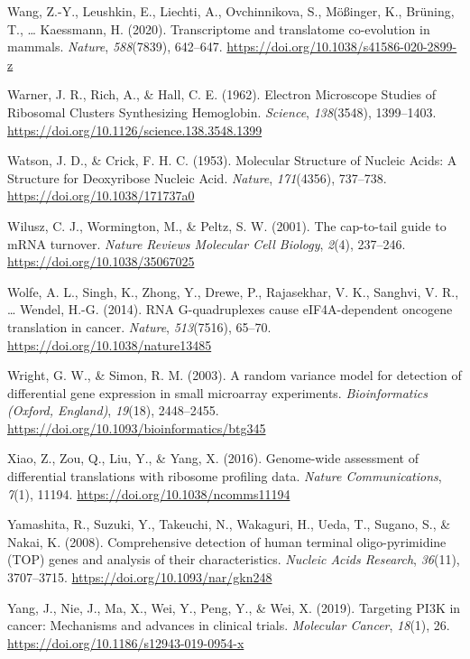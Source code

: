 \documentclass[12pt,openany]{book}
\begin{document}
\hypertarget{ref-Wang2020}{}
Wang, Z.-Y., Leushkin, E., Liechti, A., Ovchinnikova, S., Mößinger, K.,
Brüning, T., \ldots{} Kaessmann, H. (2020). Transcriptome and
translatome co-evolution in mammals. \emph{Nature}, \emph{588}(7839),
642--647. \url{https://doi.org/10.1038/s41586-020-2899-z}

\hypertarget{ref-Warner1962a}{}
Warner, J. R., Rich, A., \& Hall, C. E. (1962). Electron Microscope
Studies of Ribosomal Clusters Synthesizing Hemoglobin. \emph{Science},
\emph{138}(3548), 1399--1403.
\url{https://doi.org/10.1126/science.138.3548.1399}

\hypertarget{ref-Watson1953}{}
Watson, J. D., \& Crick, F. H. C. (1953). Molecular Structure of Nucleic
Acids: A Structure for Deoxyribose Nucleic Acid. \emph{Nature},
\emph{171}(4356), 737--738. \url{https://doi.org/10.1038/171737a0}

\hypertarget{ref-Wilusz2001}{}
Wilusz, C. J., Wormington, M., \& Peltz, S. W. (2001). The cap-to-tail
guide to mRNA turnover. \emph{Nature Reviews Molecular Cell Biology},
\emph{2}(4), 237--246. \url{https://doi.org/10.1038/35067025}

\hypertarget{ref-Wolfe2014}{}
Wolfe, A. L., Singh, K., Zhong, Y., Drewe, P., Rajasekhar, V. K.,
Sanghvi, V. R., \ldots{} Wendel, H.-G. (2014). RNA G-quadruplexes cause
eIF4A-dependent oncogene translation in cancer. \emph{Nature},
\emph{513}(7516), 65--70. \url{https://doi.org/10.1038/nature13485}

\hypertarget{ref-Wright2003}{}
Wright, G. W., \& Simon, R. M. (2003). A random variance model for
detection of differential gene expression in small microarray
experiments. \emph{Bioinformatics (Oxford, England)}, \emph{19}(18),
2448--2455. \url{https://doi.org/10.1093/bioinformatics/btg345}

\hypertarget{ref-Xiao2016}{}
Xiao, Z., Zou, Q., Liu, Y., \& Yang, X. (2016). Genome-wide assessment
of differential translations with ribosome profiling data. \emph{Nature
Communications}, \emph{7}(1), 11194.
\url{https://doi.org/10.1038/ncomms11194}

\hypertarget{ref-Yamashita2008}{}
Yamashita, R., Suzuki, Y., Takeuchi, N., Wakaguri, H., Ueda, T., Sugano,
S., \& Nakai, K. (2008). Comprehensive detection of human terminal
oligo-pyrimidine (TOP) genes and analysis of their characteristics.
\emph{Nucleic Acids Research}, \emph{36}(11), 3707--3715.
\url{https://doi.org/10.1093/nar/gkn248}

\hypertarget{ref-Yang2019}{}
Yang, J., Nie, J., Ma, X., Wei, Y., Peng, Y., \& Wei, X. (2019).
Targeting PI3K in cancer: Mechanisms and advances in clinical trials.
\emph{Molecular Cancer}, \emph{18}(1), 26.
\url{https://doi.org/10.1186/s12943-019-0954-x}
\end{document}
